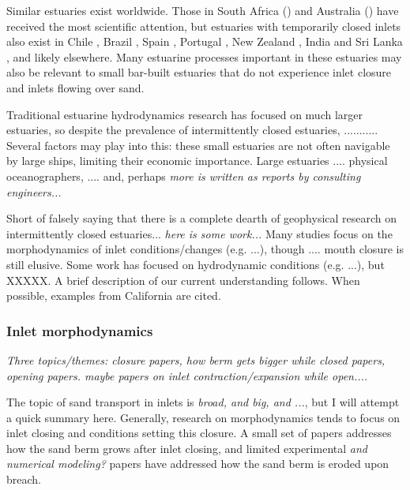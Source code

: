 Similar estuaries exist worldwide. Those in South Africa () and Australia () have received the most scientific attention, but estuaries with temporarily closed inlets also exist in Chile \parencite{dussaillant_water_2009}, Brazil \parencite{suzuki_effects_1998}, Spain \parencite{moreno_morphodynamics_2010}, Portugal \parencite{fortunato_morphological_2014}, New Zealand \parencite{schallenberg_contrasting_2010}, India and Sri Lanka \parencite{ranasinghe_seasonal_2003}, and likely elsewhere. Many estuarine processes important in these estuaries may also be relevant to small bar-built estuaries that do not experience inlet closure and inlets flowing over sand. 

Traditional estuarine hydrodynamics research has focused on much larger estuaries, so despite the prevalence of intermittently closed estuaries, ...........  Several factors may play into this: these small estuaries are not often navigable by large ships, limiting their economic importance. Large estuaries .... physical oceanographers, .... and, perhaps \emph{more is written as reports by consulting engineers...}

Short of falsely saying that there is a complete dearth of geophysical research on intermittently closed estuaries... \emph{here is some work...} Many studies focus on the morphodynamics of inlet conditions/changes (e.g. ...), though .... mouth closure is still elusive. Some work has focused on hydrodynamic conditions (e.g. ...), but XXXXX. A brief description of our current understanding follows. When possible, examples from California are cited.

\subsubsection{Inlet morphodynamics}
\emph{Three topics/themes: closure papers, how berm gets bigger while closed papers, opening papers. maybe papers on inlet contraction/expansion while open....}


The topic of sand transport in inlets is \emph{broad, and big, and ...}, but I will attempt a quick summary here. Generally, research on morphodynamics tends to focus on inlet closing and conditions setting this closure. A small set of papers addresses how the sand berm grows after inlet closing, and limited experimental \emph{and numerical modeling?} papers have addressed how the sand berm is eroded upon breach.

